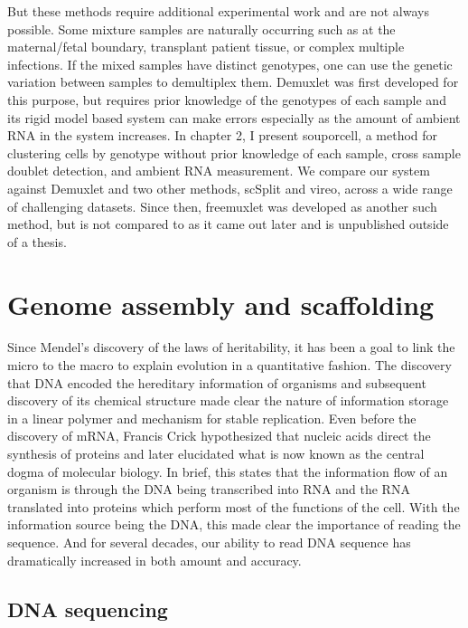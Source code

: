 \par{
But these methods require additional experimental work and are not always possible. Some mixture samples are naturally occurring such as at the maternal/fetal boundary, transplant patient tissue, or complex multiple infections. If the mixed samples have distinct genotypes, one can use the genetic variation between samples to demultiplex them. Demuxlet was first developed for this purpose, but requires prior knowledge of the genotypes of each sample and its rigid model based system can make errors especially as the amount of ambient RNA in the system increases\cite{muxseq}\cite{demuxlet}. In chapter 2, I present souporcell, a method for clustering cells by genotype without prior knowledge of each sample, cross sample doublet detection, and ambient RNA measurement. We compare our system against Demuxlet and two other methods, scSplit and vireo\cite{scsplit}\cite{vireo}, across a wide range of challenging datasets. Since then, freemuxlet was developed as another such method, but is not compared to as it came out later and is unpublished outside of a thesis\cite{freemuxlet}.
}

\section{Genome assembly and scaffolding}
\par{
Since Mendel's discovery of the laws of heritability\cite{mendel}, it has been a goal to link the micro to the macro to explain evolution in a quantitative fashion\cite{evolutionmicro}. The discovery that DNA encoded the hereditary information of organisms\cite{Avery} and subsequent discovery of its chemical structure\cite{watsoncrick} made clear the nature of information storage in a linear polymer and mechanism for stable replication. Even before the discovery of mRNA\cite{mRNA1}\cite{mRNA2}, Francis Crick hypothesized that nucleic acids direct the synthesis of proteins\cite{proteinsynthesis} and later elucidated what is now known as the central dogma of molecular biology\cite{centraldogma1}. In brief, this states that the information flow of an organism is through the DNA being transcribed into RNA and the RNA translated into proteins which perform most of the functions of the cell. With the information source being the DNA, this made clear the importance of reading the sequence. And for several decades, our ability to read DNA sequence has dramatically increased in both amount and accuracy.
}

\subsection{DNA sequencing}

